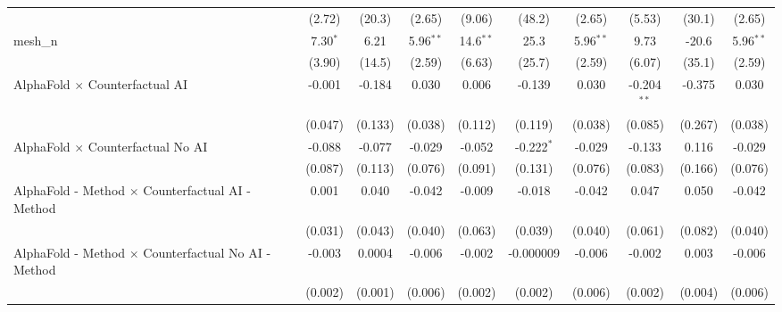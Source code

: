 \begin{tabular}{lccccccccc}
                                                               & (2.72)        & (20.3)         & (2.65)        & (9.06)        & (48.2)         & (2.65)        & (5.53)        & (30.1)         & (2.65)\\   
   mesh\_n                                                     & 7.30$^{*}$    & 6.21           & 5.96$^{**}$   & 14.6$^{**}$   & 25.3           & 5.96$^{**}$   & 9.73          & -20.6          & 5.96$^{**}$\\   
                                                               & (3.90)        & (14.5)         & (2.59)        & (6.63)        & (25.7)         & (2.59)        & (6.07)        & (35.1)         & (2.59)\\   
   AlphaFold $\times$ Counterfactual AI                        & -0.001        & -0.184         & 0.030         & 0.006         & -0.139         & 0.030         & -0.204$^{**}$ & -0.375         & 0.030\\   
                                                               & (0.047)       & (0.133)        & (0.038)       & (0.112)       & (0.119)        & (0.038)       & (0.085)       & (0.267)        & (0.038)\\   
   AlphaFold $\times$ Counterfactual No AI                     & -0.088        & -0.077         & -0.029        & -0.052        & -0.222$^{*}$   & -0.029        & -0.133        & 0.116          & -0.029\\   
                                                               & (0.087)       & (0.113)        & (0.076)       & (0.091)       & (0.131)        & (0.076)       & (0.083)       & (0.166)        & (0.076)\\   
   AlphaFold - Method $\times$ Counterfactual AI - Method      & 0.001         & 0.040          & -0.042        & -0.009        & -0.018         & -0.042        & 0.047         & 0.050          & -0.042\\   
                                                               & (0.031)       & (0.043)        & (0.040)       & (0.063)       & (0.039)        & (0.040)       & (0.061)       & (0.082)        & (0.040)\\   
   AlphaFold - Method $\times$ Counterfactual No AI - Method   & -0.003        & 0.0004         & -0.006        & -0.002        & -0.000009      & -0.006        & -0.002        & 0.003          & -0.006\\   
                                                               & (0.002)       & (0.001)        & (0.006)       & (0.002)       & (0.002)        & (0.006)       & (0.002)       & (0.004)        & (0.006)\\   

\end{tabular}
